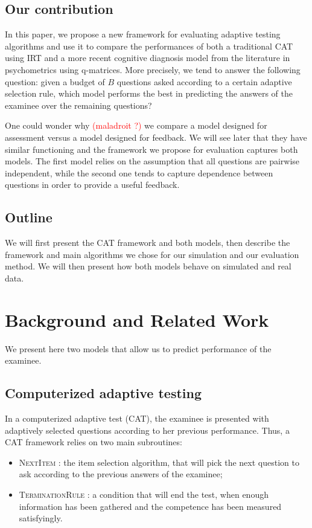 \documentclass{sig-alternate}
\newcommand\alert[1]{\textcolor{red}{#1}}
\begin{document}
\subsection{Our contribution}

In this paper, we propose a new framework for evaluating adaptive testing algorithms and use it to compare the performances of both a traditional CAT using IRT and a more recent cognitive diagnosis model from the literature in psychometrics using q-matrices. More precisely, we tend to answer the following question: given a budget of $B$ questions asked according to a certain adaptive selection rule, which model performs the best in predicting the answers of the examinee over the remaining questions?

One could wonder why \alert{(maladroit ?)} we compare a model designed for assessment versus a model designed for feedback. We will see later that they have similar functioning and the framework we propose for evaluation captures both models. The first model relies on the assumption that all questions are pairwise independent, while the second one tends to capture dependence between questions in order to provide a useful feedback.

\subsection{Outline}

We will first present the CAT framework and both models, then describe the framework and main algorithms we chose for our simulation and our evaluation method. We will then present how both models behave on simulated and real data.

\section{Background and Related Work}

We present here two models that allow us to predict performance of the examinee.

\subsection{Computerized adaptive testing}

In a computerized adaptive test (CAT), the examinee is presented with adaptively selected questions according to her previous performance. Thus, a CAT framework relies on two main subroutines:
\begin{itemize}
\item \textsc{NextItem} : the item selection algorithm, that will pick the next question to ask according to the previous answers of the examinee;
\item \textsc{TerminationRule} : a condition that will end the test, when enough information has been gathered and the competence has been measured satisfyingly.
\end{itemize}
\end{document}

